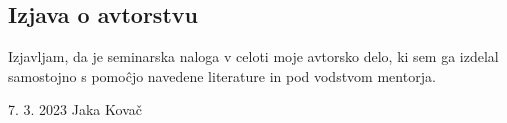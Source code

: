 \documentclass[12pt]{article}
\begin{document}
\begin{samepage}
    \thispagestyle{empty}
    \section*{Izjava o avtorstvu}
    Izjavljam, da je seminarska naloga v celoti moje avtorsko delo, ki sem ga 
    izdelal samostojno s pomoĉjo navedene literature in pod vodstvom mentorja.

    \vfill
    
    7. 3. 2023 \hfill Jaka Kovač
    
    \vspace{3 cm}
\end{samepage}
\end{document}
